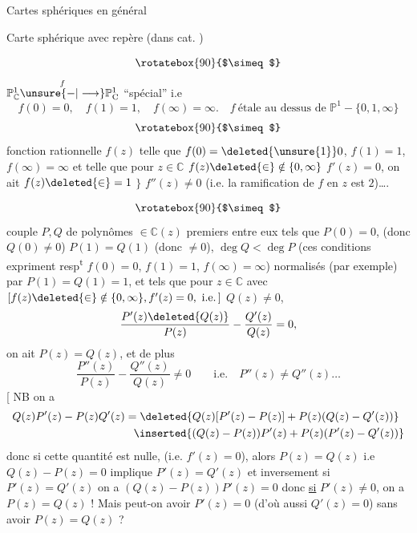 \quad Cartes sphériques en général

Carte sphérique  avec repère (dans cat. )

\[
\rotatebox{90}{$\simeq$}
\]
 $\mathbb P^{1}_{\mathbb C}\overset{f}{\unsure{-|\longrightarrow}}\mathbb P^{1}_{\mathrm C}$ ``spécial'' i.e
\[
 f(0)=0,\quad f(1)=1,\quad f(\infty)=\infty.\quad f\ \text{étale au dessus de }\mathbb P^{1}-\{0,1,\infty\}
\]
\[
\rotatebox{90}{$\simeq$}
\]
fonction rationnelle $f(z)$ telle que $f(0)=\deleted{\unsure{1}}0$, $f(1)=1$, $f(\infty)=\infty$ et telle que pour $z\in\mathbb C$  $f(z)\deleted{\in}\notin\{0,\infty\}$ $f'(z)=0$, on ait $f(z)\deleted{\in}=1$ $\}$  $f''(z)\ne0$ (i.e. la ramification de $f$ en $z$ est $2$)\ldots.

\[
\rotatebox{90}{$\simeq$}
\]
couple $P,Q$ \inserted{$[f=P/Q\quad !\,]$} de polynômes $\in\mathbb C(z)$ premiers entre eux  tels que $P(0)=0$, (donc $Q(0)\ne0$) $P(1)=Q(1)$ (donc $\ne0$), $\deg Q<\deg P$ (ces conditions expriment resp\textsuperscript{t} $f(0)=0$, $f(1)=1$, $f(\infty)=\infty$)
normalisés (par exemple) par $P(1)=Q(1)=1$, et tels que pour $z\in\mathbb C$ avec $[f(z)\deleted{\in}\notin\{0,\infty\}, f'(z)=0,\ \mathrm{i.e.}\,]$  $Q(z)\ne0$,
\[
 \frac{P'(z)\deleted{Q(z)}}{P(z)}-\frac{Q'(z)}{Q(z)}=0,
\]
on ait $P(z)=Q(z)$, et de plus
\[
 \frac{P''(z)}{P(z)}-\frac{Q''(z)}{Q(z)}\ne0\qquad\text{i.e.}\quad P''(z)\ne Q''(z)\ldots
\]
[ NB on a
\[
\begin{aligned}
 Q(z)P'(z)-P(z)Q'(z)&=\deleted{Q(z)[P'(z)-P(z)]+P(z)(Q(z)-Q'(z))}\\
 &\phantom{=}\inserted{(Q(z)-P(z))P'(z)+P(z)(P'(z)-Q'(z))}
\end{aligned}
\]
donc si  cette quantité est nulle, (i.e. $f'(z)=0$), alors $P(z)=Q(z)$  i.e $Q(z)-P(z)=0$ implique $P'(z)=Q'(z)$ et inversement si $P'(z)=Q'(z)$ on a $(Q(z)-P(z))P'(z)=0$ donc \uline{si} $P'(z)\ne0$, on a $P(z)=Q(z)$ ! Mais peut-on avoir $P'(z)=0$ (d'où aussi $Q'(z)=0$) \unsure{$\}$|)} sans avoir $P(z)=Q(z)$ ?


